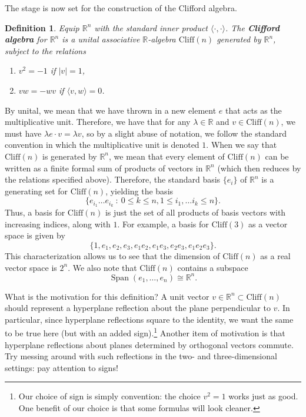 \documentclass{article}
\newcommand{\R}{\mathbb{R}}
\DeclareMathOperator{\Span}{Span}
\newtheorem{definition}{Definition}[subsection]
\begin{document}
The stage is now set for the construction of the Clifford algebra.

\vspace{0.5em}

\begin{definition}
Equip $\R^n$ with the standard inner product $\langle \cdot,\cdot \rangle$. The \textbf{Clifford algebra} for $\R^n$ is a unital associative $\R$-algebra $\mathrm{Cliff}(n)$ generated by $\R^n$, subject to the relations
\begin{enumerate}
\item $v^2 = -1$ if $|v| = 1$,
\item $vw = -wv$ if $\langle v,w \rangle = 0$.
\end{enumerate}
\end{definition}

\vspace{0.5em}

By unital, we mean that we have thrown in a new element $e$ that acts as the multiplicative unit. Therefore, we have that for any $\lambda \in \R$ and $v \in \mathrm{Cliff}(n)$, we must have $\lambda e \cdot v = \lambda v$, so by a slight abuse of notation, we follow the standard convention in which the multiplicative unit is denoted $1$. When we say that $\mathrm{Cliff}(n)$ is generated by $\R^n$, we mean that every element of $\mathrm{Cliff}(n)$ can be written as a finite formal sum of products of vectors in $\R^n$ (which then reduces by the relations specified above). Therefore, the standard basis $\{e_i\}$ of $\R^n$ is a generating set for $\mathrm{Cliff}(n)$, yielding the basis
$$\{e_{i_1} \ldots e_{i_k} ~:~ 0 \leq k \leq n, 1 \leq i_1, \ldots i_k \leq n\}.$$
Thus, a basis for $\mathrm{Cliff}(n)$ is just the set of all products of basis vectors with increasing indices, along with $1$. For example, a basis for $\mathrm{Cliff}(3)$ as a vector space is given by
$$\{1, e_1, e_2, e_3, e_1e_2, e_1e_3, e_2e_3, e_1e_2e_3\}.$$
This characterization allows us to see that the dimension of $\mathrm{Cliff}(n)$ as a real vector space is $2^n$. We also note that $\mathrm{Cliff}(n)$ contains a subspace
$$\Span(e_1, \ldots, e_n) \cong \R^n.$$

What is the motivation for this definition? A unit vector $v \in \R^n \subset \mathrm{Cliff}(n)$ should represent a hyperplane reflection about the plane perpendicular to $v$. In particular, since hyperplane reflections square to the identity, we want the same to be true here (but with an added sign).\footnote{Our choice of sign is simply convention: the choice $v^2 = 1$ works just as good. One benefit of our choice is that some formulas will look cleaner.} Another item of motivation is that hyperplane reflections about planes determined by orthogonal vectors commute. Try messing around with such reflections in the two- and three-dimensional settings: pay attention to signs!
\end{document}
